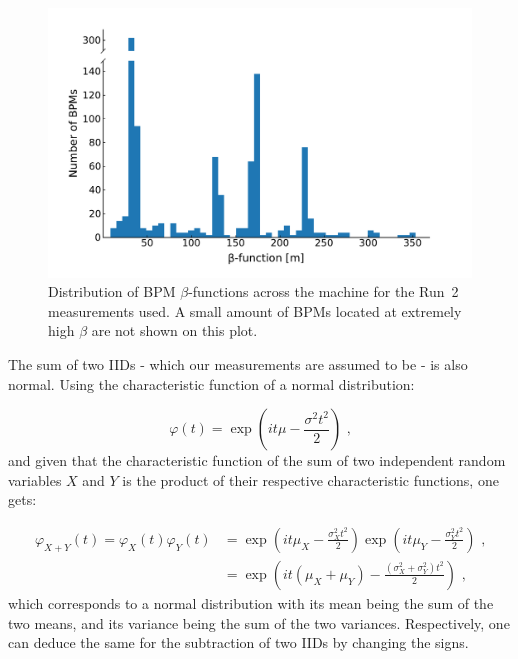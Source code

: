 \begin{figure}[!htb]
    \centering
    \includegraphics*[width=\textwidth]{Figures/Other_Studies/bpms_betas_histogram.pdf}
    \caption{Distribution of BPM \(\beta\)-functions across the machine for the Run~\num{2} measurements used. A small amount of BPMs located at extremely high \(\beta\) are not shown on this plot.}
    \label{figure:bpms_betas_histogram}
\end{figure}

The sum of two IIDs - which our measurements are assumed to be - is also normal.
Using the characteristic function of a normal distribution:

\begin{equation}
    \varphi(t) = \exp \left( it \mu - \frac{\sigma^2 t^2}{2} \right) \text{ ,}
    \label{equations:normal_distribution_characteristic_function}
\end{equation}
and given that the characteristic function of the sum of two independent random variables \(X\) and \(Y\) is the product of their respective characteristic functions, one gets:

\begin{equation}
    \begin{aligned}
        \varphi_{X+Y}(t) = \varphi_{X}(t) \varphi_{Y}(t) &= \exp \left( it \mu_{X} - \frac{\sigma_{X}^2 t^2}{2} \right) \exp \left(it \mu_{Y} - \frac{\sigma_{Y}^2 t^2}{2} \right)  \text{ ,} \\
                                                         &= \exp \left( it \left( \mu_{X} + \mu_{Y} \right) - \frac{\left( \sigma_{X}^2 + \sigma_{Y}^2 \right) t^2}{2} \right)  \text{ ,}
    \end{aligned}
\end{equation}
which corresponds to a normal distribution with its mean being the sum of the two means, and its variance being the sum of the two variances.
Respectively, one can deduce the same for the subtraction of two IIDs by changing the signs.

